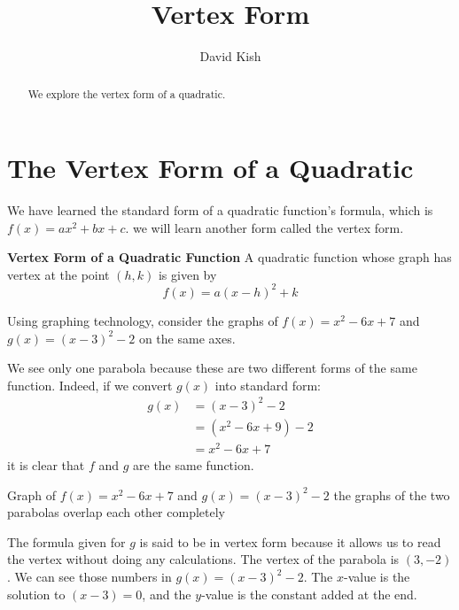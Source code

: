 \documentclass{ximera}
\author{David Kish}
\title{Vertex Form}
\begin{document}
\begin{abstract}
We explore the vertex form of a quadratic.
\end{abstract}
\maketitle


\section{The Vertex Form of a Quadratic}

      We have learned the standard form of a quadratic function's formula, which is $f(x)=ax^2+bx+c$.
      we will learn another form called the vertex form.
\begin{callout} \textbf{\large{Vertex Form of a Quadratic Function}}
          A quadratic function whose graph has vertex at the point $(h,k)$ is given by
$$
f(x)=a(x-h)^2+k
$$
\end{callout}
      Using graphing technology, consider the graphs of $f(x)=x^2-6x+7$ and $g(x)=(x-3)^2-2$ on the same axes.

        We see only one parabola because these are two different forms of the same function.
        Indeed, if we convert $g(x)$ into standard form:
	\begin{align*}
		g(x)&=(x-3)^2-2\\
			&=(x^2-6x+9)-2\\
			&=x^2-6x+7
	\end{align*}
        it is clear that $f$ and $g$ are the same function.
 

       Graph of $f(x)=x^2-6x+7$ and $g(x)=(x-3)^2-2$
       the graphs of the two parabolas overlap each other completely

       \begin{image}
       \end{image}



      The formula given for $g$ is said to be in vertex form
      because it allows us to read the vertex without doing any calculations.
      The vertex of the parabola is $(3,-2)$.
      We can see those numbers in $g(x)=(x-3)^2-2$.
      The $x$-value is the solution to $(x-3)=0$,
      and the $y$-value is the constant
      added at the end.
\end{document}
